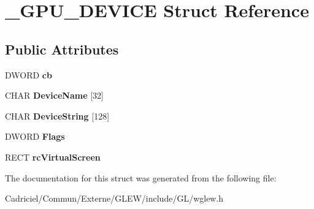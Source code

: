 \hypertarget{struct___g_p_u___d_e_v_i_c_e}{}\section{\+\_\+\+G\+P\+U\+\_\+\+D\+E\+V\+I\+CE Struct Reference}
\label{struct___g_p_u___d_e_v_i_c_e}
\subsection*{Public Attributes}
\begin{DoxyCompactItemize}
\item 
D\+W\+O\+RD {\bfseries cb}\hypertarget{struct___g_p_u___d_e_v_i_c_e_afcb22f16ba9e526610489ff56ab78ddb}{}\label{struct___g_p_u___d_e_v_i_c_e_afcb22f16ba9e526610489ff56ab78ddb}

\item 
C\+H\+AR {\bfseries Device\+Name} \mbox{[}32\mbox{]}\hypertarget{struct___g_p_u___d_e_v_i_c_e_a604bfab61f1a2c5d1e635837d369ba14}{}\label{struct___g_p_u___d_e_v_i_c_e_a604bfab61f1a2c5d1e635837d369ba14}

\item 
C\+H\+AR {\bfseries Device\+String} \mbox{[}128\mbox{]}\hypertarget{struct___g_p_u___d_e_v_i_c_e_aff8b7920ccc85afcd6f325da6cdb0b73}{}\label{struct___g_p_u___d_e_v_i_c_e_aff8b7920ccc85afcd6f325da6cdb0b73}

\item 
D\+W\+O\+RD {\bfseries Flags}\hypertarget{struct___g_p_u___d_e_v_i_c_e_a008db9d0f5fc13a5160805f40465f14a}{}\label{struct___g_p_u___d_e_v_i_c_e_a008db9d0f5fc13a5160805f40465f14a}

\item 
R\+E\+CT {\bfseries rc\+Virtual\+Screen}\hypertarget{struct___g_p_u___d_e_v_i_c_e_aeb573bbeb3b6c589246720ef259b9a27}{}\label{struct___g_p_u___d_e_v_i_c_e_aeb573bbeb3b6c589246720ef259b9a27}

\end{DoxyCompactItemize}


The documentation for this struct was generated from the following file\+:\begin{DoxyCompactItemize}
\item 
Cadriciel/\+Commun/\+Externe/\+G\+L\+E\+W/include/\+G\+L/wglew.\+h\end{DoxyCompactItemize}
